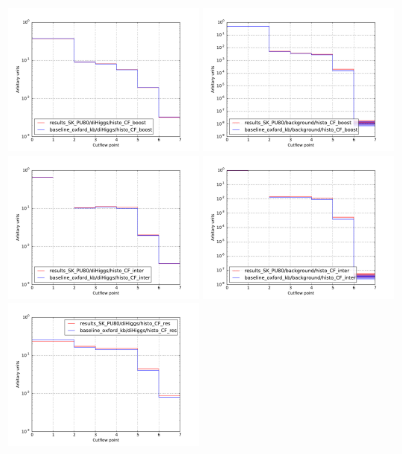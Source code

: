 \documentclass[11pt]{article}
\begin{document}
\begin{figure}[ht]
\begin{center}
\includegraphics[width=0.45\textwidth]{plots/diHiggs_PU80_CF_boost.pdf}
\includegraphics[width=0.45\textwidth]{plots/background_PU80_CF_boost.pdf}\\
\includegraphics[width=0.45\textwidth]{plots/diHiggs_PU80_CF_inter.pdf}
\includegraphics[width=0.45\textwidth]{plots/background_PU80_CF_inter.pdf}\\
\includegraphics[width=0.45\textwidth]{plots/diHiggs_PU80_CF_res.pdf}

\end{center}
\end{figure}
\end{document}
